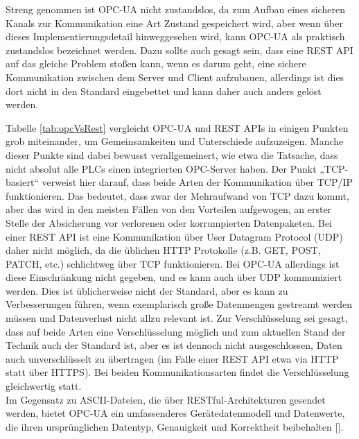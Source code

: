 Streng genommen ist OPC-UA nicht zustandslos, da zum Aufbau eines sicheren Kanals zur Kommunikation eine Art Zustand gespeichert wird, aber wenn über dieses Implementierungsdetail hinweggesehen wird, kann OPC-UA als praktisch zustandslos bezeichnet werden. Dazu sollte auch gesagt sein, dass eine REST API auf das gleiche Problem stoßen kann, wenn es darum geht, eine sichere Kommunikation zwischen dem Server und Client aufzubauen, allerdings ist dies dort nicht in den Standard eingebettet und kann daher auch anders gelöst werden.

Tabelle \ref{tab:opcVsRest} vergleicht OPC-UA und REST APIs in einigen Punkten grob miteinander, um Gemeinsamkeiten und Unterschiede aufzuzeigen. Manche dieser Punkte sind dabei bewusst verallgemeinert, wie etwa die Tatsache, dass nicht absolut alle PLCs einen integrierten OPC-Server haben. Der Punkt „TCP-basiert“ verweist hier darauf, dass beide Arten der Kommunikation über TCP/IP funktionieren. Das bedeutet, dass zwar der Mehraufwand von TCP dazu kommt, aber das wird in den meisten Fällen von den Vorteilen aufgewogen, an erster Stelle der Absicherung vor verlorenen oder korrumpierten Datenpaketen. Bei einer REST API ist eine Kommunikation über User Datagram Protocol (UDP) daher nicht möglich, da die üblichen HTTP Protokolle (z.B. GET, POST, PATCH, etc.) schlichtweg über TCP funktionieren. Bei OPC-UA allerdings ist diese Einschränkung nicht gegeben, und es kann auch über UDP kommuniziert werden. Dies ist üblicherweise nicht der Standard, aber es kann zu Verbesserungen führen, wenn exemplarisch große Datenmengen gestreamt werden müssen und Datenverlust nicht allzu relevant ist. Zur Verschlüsselung sei gesagt, dass auf beide Arten eine Verschlüsselung möglich und zum aktuellen Stand der Technik auch der Standard ist, aber es ist dennoch nicht ausgeschlossen, Daten auch unverschlüsselt zu übertragen (im Falle einer REST API etwa via HTTP statt über HTTPS). Bei beiden Kommunikationsarten findet die Verschlüsselung gleichwertig statt.\\
Im Gegensatz zu ASCII-Dateien, die über RESTful-Architekturen gesendet werden, bietet OPC-UA ein umfassenderes Gerätedatenmodell und Datenwerte, die ihren ursprünglichen Datentyp, Genauigkeit und Korrektheit beibehalten [\cite{whyOpc}].
%
\bgroup
\def\arraystretch{1.5}
